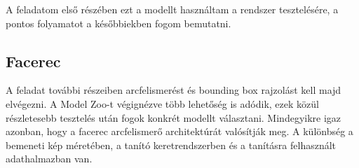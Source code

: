 A feladatom első részében ezt a modellt használtam a rendszer tesztelésére, a pontos folyamatot a későbbiekben fogom bemutatni.

\subsection{Facerec}
A feladat további részeiben arcfelismerést és bounding box rajzolást kell majd elvégezni. A Model Zoo-t végignézve több lehetőség is adódik, ezek közül részletesebb tesztelés után fogok konkrét modellt választani. Mindegyikre igaz azonban, hogy a facerec arcfelismerő architektúrát valósítják meg. A különbség a bemeneti kép méretében, a tanító keretrendszerben és a tanításra felhasznált adathalmazban van.


